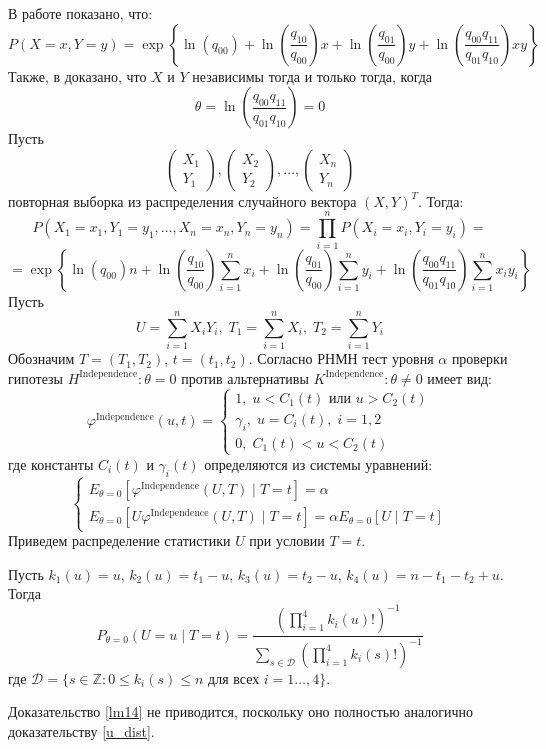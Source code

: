 В работе \cite{Dai2013} показано, что:
$$
P(X=x,Y=y)= \exp \left\{\ln(q_{00}) + 
     \ln \left(\dfrac{q_{10}}{q_{00}}\right) x
    +  \ln \left(\dfrac{q_{01}}{q_{00}}\right) y +
     \ln\left(\dfrac{q_{00}q_{11}}{q_{01}q_{10}}\right) xy
 \right\}
$$
Также, в \cite{Dai2013} доказано, что 
$X$ и $Y$ независимы тогда и только тогда, когда
$$\theta=\ln\left(\dfrac{q_{00}q_{11}}{q_{01}q_{10}}\right)=0$$
Пусть
    $$
        \begin{pmatrix}
            X_1 \\
            Y_1 
        \end{pmatrix},
        \begin{pmatrix}
            X_2 \\
            Y_2
        \end{pmatrix}, \ldots,
        \begin{pmatrix}
            X_n \\
            Y_n
        \end{pmatrix}
    $$ повторная выборка из распределения случайного вектора $(X,Y)^T$. Тогда:
$$
    P(X_1=x_1,Y_1=y_1,\ldots,X_n=x_n,Y_n=y_n)
    =\prod_{i=1}^n P(X_i=x_i,Y_i=y_i) =
    $$
    $$
    =\exp \left\{ \ln(q_{00})n + 
        \ln \left(\dfrac{q_{10}}{q_{00}}\right) \sum_{i=1}^n x_i 
        +\ln \left(\dfrac{q_{01}}{q_{00}}\right) \sum_{i=1}^{n} y_i   +
        \ln\left(\dfrac{q_{00}q_{11}}{q_{01}q_{10}}\right) \sum_{i=1}^n x_i y_i 
     \right\}
    $$
    Пусть 
    $$
    U = \sum_{i=1}^n X_i Y_i,\;
    T_1 = \sum_{i=1}^n X_i,\;
    T_2 = \sum_{i=1}^n Y_i
    $$
    Обозначим $T=(T_1,T_2)$, $t=(t_1,t_2)$.
    Согласно \cite{Lehmann1986} РНМН тест уровня $\alpha$ проверки гипотезы $H^{\text{Independence}}: \theta = 0$ против альтернативы $K^{\text{Independence}}: \theta \neq 0$ 
    имеет вид:
    $$
    \varphi^{\text{Independence}}(u,t)=\begin{cases}
        1, \; u<C_1(t) \text{ или } u>C_2(t)\\
        \gamma_i, \; u=C_i(t), \; i=1,2\\
        0, \; C_1(t)<u<C_2(t)
    \end{cases}
    $$
    где константы $C_i(t)$ и $\gamma_i(t)$ определяются из системы уравнений:
    $$
    \begin{cases}
        E_{\theta=0}[\varphi^{\text{Independence}}(U,T) \mid T=t]=\alpha \\
        E_{\theta=0}[U\varphi^{\text{Independence}}(U,T) \mid T=t]=\alpha E_{\theta=0}[U \mid T=t]
    \end{cases}
    $$
    Приведем распределение статистики $U$ при условии $T=t$.
\begin{lemma}\label{lm14}
    Пусть $k_1(u)=u$, $k_2(u)=t_1-u$, $k_3(u)=t_2-u$,
    $k_4(u)=n-t_1-t_2+u$.
        Тогда
        $$P_{\theta=0}(U=u \mid T=t)=\dfrac{(\prod_{i=1}^4 k_i(u)!)^{-1}}
            {\sum_{s\in \mathcal{D}} (\prod_{i=1}^4 k_i(s)!)^{-1}}$$
        где $\mathcal{D}=\{s \in \mathbb{Z}: 0\leq k_i(s) \leq n \text{ для всех } i=1\ldots,4\}$.
\end{lemma}
Доказательство \autoref{lm14} не приводится, поскольку оно полностью 
аналогично доказательству \autoref{u_dist}.

